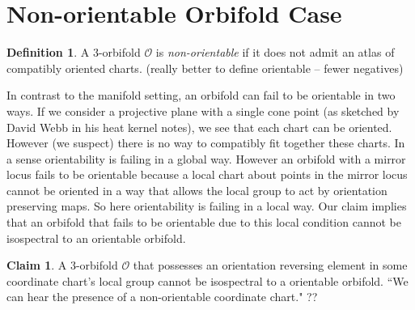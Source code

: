 \documentclass[12pt]{article}
\theoremstyle{definition}
\newtheorem{definition}[theorem]{Definition}
\newtheorem{claim}[theorem]{Claim}
\begin{document}
\section{Non-orientable Orbifold Case}

\begin{definition}
    A $3$-orbifold $\mathcal{O}$ is \emph{non-orientable} if it does not admit an atlas of compatibly oriented charts.  (really better to define orientable -- fewer negatives)
\end{definition}

In contrast to the manifold setting, an orbifold can fail to be orientable in two ways.  If we consider a projective plane with a single cone point (as sketched by David Webb in his heat kernel notes), we see that each chart can be oriented.  However (we suspect) there is no way to compatibly fit together these charts.  In a sense orientability is failing in a global way.  However an orbifold with a mirror locus fails to be orientable because a local chart about points in the mirror locus cannot be oriented in a way that allows the local group to act by orientation preserving maps.  So here orientability is failing in a local way.  Our claim implies that an orbifold that fails to be orientable due to this local condition cannot be isospectral to an orientable orbifold.



\begin{claim}
    A $3$-orbifold $\mathcal{O}$ that possesses an orientation reversing element in some coordinate chart's local group cannot be isospectral to a orientable orbifold.  ``We can hear the presence of a non-orientable coordinate chart." ??
\end{claim}
\end{document}
